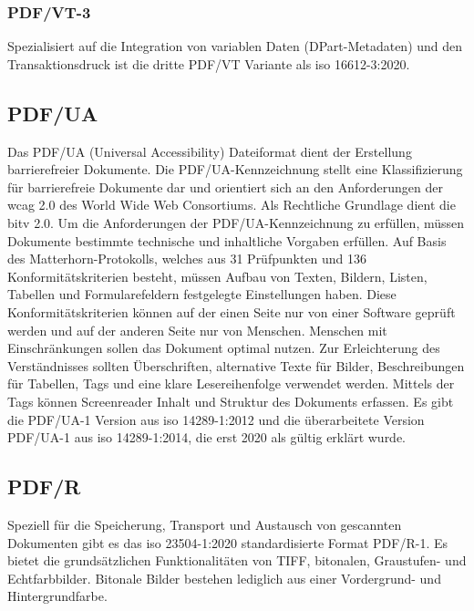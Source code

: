 \subsubsection{PDF/VT-3}
Spezialisiert auf die Integration von variablen Daten (DPart-Metadaten) und den Transaktionsdruck ist die dritte PDF/VT Variante als \gls{iso} 16612-3:2020. \cite{proj-consult}


\subsection{PDF/UA}
Das PDF/UA (Universal Accessibility) Dateiformat dient der Erstellung barrierefreier Dokumente. Die PDF/UA-Kennzeichnung stellt eine Klassifizierung für barrierefreie Dokumente dar und orientiert sich an den Anforderungen der \gls{wcag} 2.0 des World Wide Web Consortiums. Als Rechtliche Grundlage dient die \gls{bitv} 2.0. Um die Anforderungen der PDF/UA-Kennzeichnung zu erfüllen, müssen Dokumente bestimmte technische und inhaltliche Vorgaben erfüllen. Auf Basis des Matterhorn-Protokolls, welches aus 31 Prüfpunkten und 136 Konformitätskriterien besteht, müssen Aufbau von Texten, Bildern, Listen, Tabellen und Formularefeldern festgelegte Einstellungen haben. Diese Konformitätskriterien können auf der einen Seite nur von einer Software geprüft werden und auf der anderen Seite nur von Menschen. Menschen mit Einschränkungen sollen das Dokument optimal nutzen. Zur Erleichterung des Verständnisses sollten Überschriften, alternative Texte für Bilder, Beschreibungen für Tabellen, Tags und eine klare Lesereihenfolge verwendet werden. Mittels der Tags können Screenreader Inhalt und Struktur des Dokuments erfassen. \cite{adobe-pdf-ua} Es gibt die PDF/UA-1 Version aus \gls{iso} 14289-1:2012 und die überarbeitete Version PDF/UA-1 aus \gls{iso} 14289-1:2014, die erst 2020 als gültig erklärt wurde. \cite{proj-consult}


\subsection{PDF/R}
Speziell für die Speicherung, Transport und Austausch von gescannten Dokumenten gibt es das \gls{iso} 23504-1:2020 standardisierte Format PDF/R-1. Es bietet die grundsätzlichen Funktionalitäten von TIFF, bitonalen, Graustufen- und Echtfarbbilder. 
\cite{proj-consult} Bitonale Bilder bestehen lediglich aus einer Vordergrund- und Hintergrundfarbe. 


